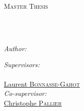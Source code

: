 \documentclass[
11pt, %
american, %
singlespacing, %
parskip, %
headsepline, %
table,
dvipsnames
]{MastersDoctoralThesis} %
\author{Songsheng \textsc{Ying}} %
\begin{document}

\frontmatter %

\pagestyle{plain} %


\begin{titlepage}
\begin{center}

\vspace*{.02\textheight}
{\scshape\LARGE \univname\par}\vspace{1.5cm} %
\textsc{\Large Master Thesis}\\[0.5cm] %

\HRule \\[0.4cm] %
{\huge \bfseries \ttitle\par}\vspace{0.4cm} %
\HRule \\[1cm] %
 
\begin{minipage}[t]{0.4\textwidth}
\begin{flushleft} \large
\emph{Author:}\\
\href{https://nicolasy.tk}{\authorname} %
\end{flushleft}
\end{minipage}
\begin{minipage}[t]{0.4\textwidth}
\begin{flushright} \large
\emph{Supervisors:} \\
\href{http://cams.ehess.fr/sabine-ploux/}{\supname}\\ %
\href{http://cams.ehess.fr/laurent-bonnasse-gahot/}{Laurent \textsc{Bonnasse-Gahot}} \\[0.3cm]
\emph{Co-supervisor:} \\
\href{http://www.pallier.org/pages/cv.html#cv}{Christophe \textsc{Pallier}}
\end{flushright}
\end{minipage}\\[2cm]


\end{center}
\end{titlepage}
\end{document}
